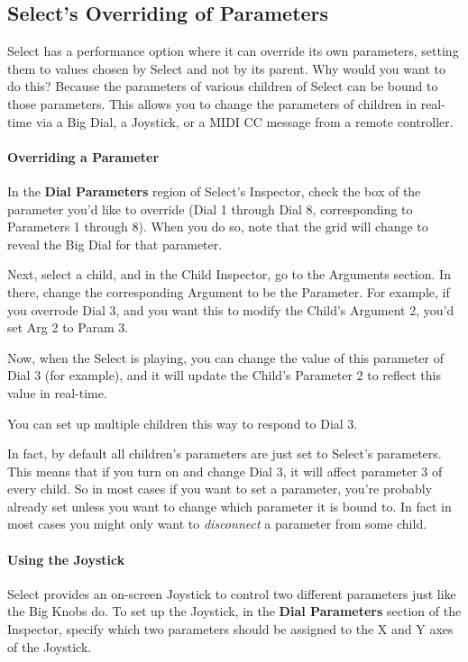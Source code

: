 \documentclass[twoside,10pt]{article}
\begin{document}
\subsection{Select's Overriding of Parameters}
\label{selectparameters}

Select has a performance option where it can override its own parameters, setting them to values chosen by Select and not by its parent.  Why would you want to do this?  Because the parameters of various children of Select can be bound to those parameters.  This allows you to change the parameters of children in real-time via a Big Dial, a Joystick, or a MIDI CC message from a remote controller.

\paragraph{Overriding a Parameter}

In the {\bf Dial Parameters} region of Select's Inspector, check the box of the parameter you'd like to override (Dial 1 through Dial 8, corresponding to Parameters 1 through 8).  When you do so, note that the grid will change to reveal the Big Dial for that parameter.

Next, select a child, and in the Child Inspector, go to the Arguments section.  In there, change the corresponding Argument to be the Parameter.  For example, if you overrode Dial 3, and you want this to modify the Child's Argument 2, you'd set Arg 2 to Param 3.  

Now, when the Select is playing, you can change the value of this parameter of Dial 3 (for example), and it will update the Child's Parameter 2 to reflect this value in real-time.

You can set up multiple children this way to respond to Dial 3.

In fact, by default all children's parameters are just set to Select's parameters.  This means that if you turn on and change Dial 3, it will affect parameter 3 of every child.  So in most cases if you want to set a parameter, you're probably already set unless you want to change which parameter it is bound to.  In fact in most cases you might only want to {\it disconnect} a parameter from some child.

\paragraph{Using the Joystick}
Select provides an on-screen Joystick to control two different parameters just like the Big Knobs do.  To set up the Joystick, in the {\bf Dial Parameters} section of the Inspector, specify which two parameters should be assigned to the X and Y axes of the Joystick.
\end{document}
